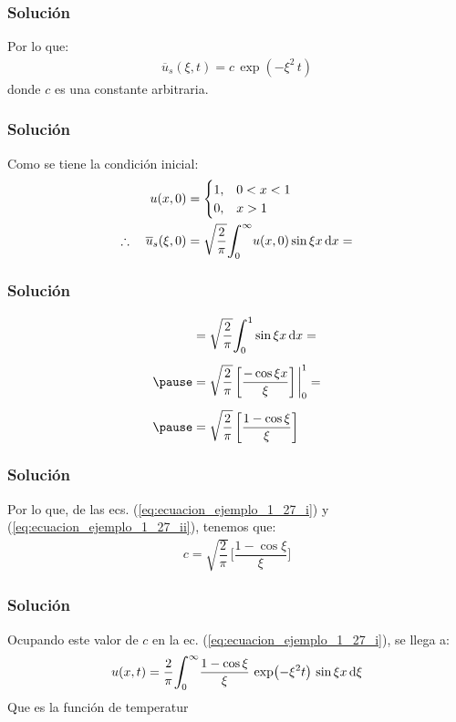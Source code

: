\begin{frame}
\frametitle{Solución}
Por lo que:
\pause
\begin{align}
\overline{u}_{s} (\xi, t) = c \, \exp(-\xi^{2} \, t)
\label{eq:ecuacion_ejemplo_1_27_i}
\end{align}
donde $c$ es una constante arbitraria.
\end{frame}
\begin{frame}
\frametitle{Solución}
Como se tiene la condición inicial:
\pause
\begin{eqnarray*}
\begin{aligned}
u (x, 0) &= \begin{cases}
1, & 0 < x < 1  \\
0, & x > 1
\end{cases}
\\
\therefore \quad \overline{u}_{s} (\xi, 0) &= \sqrt{\dfrac{2}{\pi}} \scaleint{6ex}_{\bs 0}^{\infty} u (x, 0) \sin \xi x \dd{x}=
\end{aligned}
\end{eqnarray*}
\end{frame}
\begin{frame}
\frametitle{Solución}
\begin{eqnarray}
\begin{aligned}[b]
&= \sqrt{\dfrac{2}{\pi}} \scaleint{6ex}_{\bs 0}^{1} \sin \xi x \dd{x} = \\[0.5em] \pause 
&= \sqrt{\dfrac{2}{\pi}} \, \bigg[ \dfrac{- \cos \xi x}{\xi} \bigg] \eval_{0}^{1} = \\[0.5em] \pause
&= \sqrt{\dfrac{2}{\pi}} \, \bigg[ \dfrac{1 - \cos \xi}{\xi} \bigg]
\end{aligned}
\label{eq:ecuacion_ejemplo_1_27_ii}
\end{eqnarray}
\end{frame}
\begin{frame}
\frametitle{Solución}
Por lo que, de las ecs. (\ref{eq:ecuacion_ejemplo_1_27_i}) y (\ref{eq:ecuacion_ejemplo_1_27_ii}), tenemos que:
\pause
\begin{align*}
c = \sqrt{\dfrac{2}{\pi}} \, \bigg[ \dfrac{1 - \cos \xi}{\xi} \bigg]
\end{align*}
\end{frame}
\begin{frame}
\frametitle{Solución}  
Ocupando este valor de $c$ en la ec. (\ref{eq:ecuacion_ejemplo_1_27_i}), se llega a:
\pause
\begin{align*}
u (x, t) = \dfrac{2}{\pi} \scaleint{6ex}_{\bs 0}^{\infty} \dfrac{1 - \cos \xi}{\xi} \, \exp(-\xi^{2} t) \, \sin \xi x\dd{\xi}
\end{align*}
\pause
Que es la función de temperatur
\end{frame}
